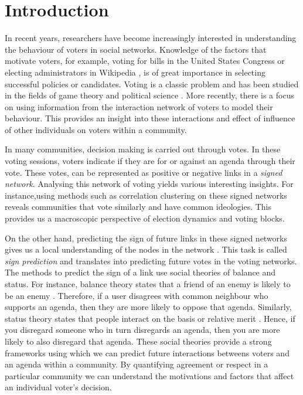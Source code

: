 \chapter{Introduction}



In recent years, researchers have become increasingly interested in understanding the behaviour of voters in social networks. Knowledge of the factors that motivate voters, for example, voting for bills in the United States Congress \cite{karimi2019multicongress} or electing administrators in Wikipedia \cite{jankowski-lorek2013MBSN,cabunducan2011voting,lee2012uncovering}, is of great importance in selecting successful policies or candidates. Voting is a classic problem and has been studied in the fields of game theory and political science \cite{zou2015strategicDoodle,kearns2009behavioral,tal2015a}. More recently, there is a focus on using information from the interaction network of voters to model their behaviour. This provides an insight into these interactions and effect of influence of other individuals on voters within a community.

In many communities, decision making is carried out through votes.
In these voting sessions, voters indicate if they are for or against an agenda through their vote.
These votes, can be represented as positive or negative links in a \textit{signed network}.
Analysing this network of voting yields various interesting insights.
For instance,using methods such as correlation clustering \cite{brito2020aBrazil,levorato2016brazilian,chiang2014prediction} on these signed networks reveals communities that vote similarly and have common ideologies. 
This provides us a macroscopic perspective of election dynamics and voting blocks.

On the other hand, predicting the sign of future links in these signed networks gives us a local understanding of the nodes in the network \cite{leskovec2010predicting,leskovec2010signed,chiang2011exploiting}.
This task is called \textit{sign prediction} and translates into predicting future votes in the voting networks.
The methods to predict the sign of a link use social theories of balance and status.
For instance, balance theory states that a friend of an enemy is likely to be an enemy \cite{harary1953on}.
Therefore, if a user disagrees with common neighbour who supports an agenda, then they are more likely to oppose that agenda. 
Similarly, status theory states that people interact on the basis or relative merit \cite{leskovec2010predicting}.
Hence, if you disregard someone who in turn disregards an agenda, then you are more likely to also disregard that agenda.
These social theories provide a strong frameworks using which we can predict future interactions betweens voters and an agenda within a community.
By quantifying agreement or respect in a particular community we can understand the motivations and factors that affect an individual voter's decision.

